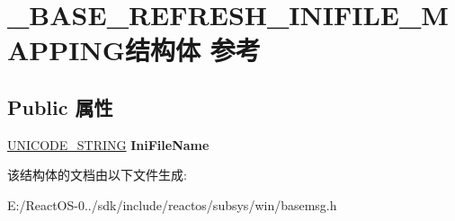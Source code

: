 \hypertarget{struct___b_a_s_e___r_e_f_r_e_s_h___i_n_i_f_i_l_e___m_a_p_p_i_n_g}{}\section{\+\_\+\+B\+A\+S\+E\+\_\+\+R\+E\+F\+R\+E\+S\+H\+\_\+\+I\+N\+I\+F\+I\+L\+E\+\_\+\+M\+A\+P\+P\+I\+N\+G结构体 参考}
\label{struct___b_a_s_e___r_e_f_r_e_s_h___i_n_i_f_i_l_e___m_a_p_p_i_n_g}
\subsection*{Public 属性}
\begin{DoxyCompactItemize}
\item 
\mbox{\label{struct___b_a_s_e___r_e_f_r_e_s_h___i_n_i_f_i_l_e___m_a_p_p_i_n_g_aadcb0832b16969536fb4cc909559b76b}} 
\hyperlink{struct___u_n_i_c_o_d_e___s_t_r_i_n_g}{U\+N\+I\+C\+O\+D\+E\+\_\+\+S\+T\+R\+I\+NG} {\bfseries Ini\+File\+Name}
\end{DoxyCompactItemize}


该结构体的文档由以下文件生成\+:\begin{DoxyCompactItemize}
\item 
E\+:/\+React\+O\+S-\/0../sdk/include/reactos/subsys/win/basemsg.\+h\end{DoxyCompactItemize}
